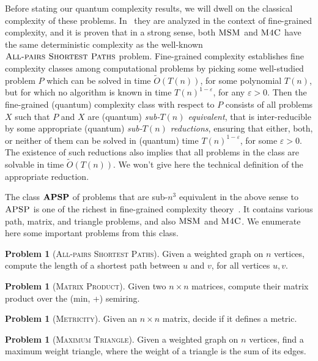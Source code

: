 \documentclass[12pt]{article}
\newcommand{\MP}{\textsc{Matrix Product}}
\newcommand{\Met}{\textsc{Metricity}}
\newcommand{\MaxT}{\textsc{Maximum Triangle}}
\newcommand{\MaxSubM}{\textsc{MSM}}
\newcommand{\MaxFourC}{\textsc{M4C}}
\newcommand{\APSPf}{\textsc{All-pairs Shortest Paths}}
\newcommand{\APSPc}{\bf{APSP}}
\newcommand{\APSP}{\textsc{APSP}}
\theoremstyle{definition}
\newtheorem{problem}[theorem]{Problem}
\begin{document}
Before stating our quantum complexity results, we will dwell on the classical complexity of these problems. 
In~\cite{BDT16} they are analyzed in the context of fine-grained complexity, and it is proven that in a strong sense, both $\MaxSubM$ and $\MaxFourC$ have the same deterministic complexity as the well-known $\APSPf$ problem.  
Fine-grained complexity establishes fine complexity classes among computational problems by picking some well-studied problem $P$ which can be solved in time $\widetilde{O}(T(n))$, for some polynomial $T(n)$, but for which no algorithm is known in time $T(n)^{1- \varepsilon}$, for any $\varepsilon > 0$.
Then the fine-grained (quantum) complexity class with respect to $P$ consists of all problems $X$ such that $P$ and $X$ are (quantum) {\em sub-$T(n)$ equivalent}, that is inter-reducible by some appropriate (quantum) {\em sub-$T(n)$ reductions}, ensuring that either, both, or neither of them can be solved in (quantum) time $T(n)^{1- \varepsilon}$, for some $\varepsilon > 0$. The existence of such reductions also implies that all problems in the class are solvable in time $\widetilde{O}(T(n))$. We won't give here the technical definition of the appropriate reduction.

The class $\APSPc$ of problems that are sub-$n^3$ equivalent in the above sense to $\APSP$ is one of the richest in fine-grained complexity theory~\cite{VW18, Vas19}. It contains various path, matrix, and triangle problems, and also $\MaxSubM$ and $\MaxFourC$.  We enumerate here some important problems from this class.

\begin{problem}[\APSPf]
\label{prob:apsp}
  Given a weighted graph on $n$ vertices, compute the length of a shortest path between $u$ and $v$, for all vertices $u,v$.
\end{problem}

\begin{problem}[\MP]
\label{prob:mp}
  Given two $n \times n$ matrices, compute their matrix product over the (min, +) semiring.
\end{problem}

\begin{problem}[\Met]
\label{prob:met}
  Given an $n \times n$ matrix, decide if it defines a metric.
\end{problem}

\begin{problem}[\MaxT]
\label{prob:maxt}
 Given a weighted graph on $n$ vertices, find a maximum weight triangle, where the weight of a triangle is the sum of its edges.
\end{problem}
\end{document}
